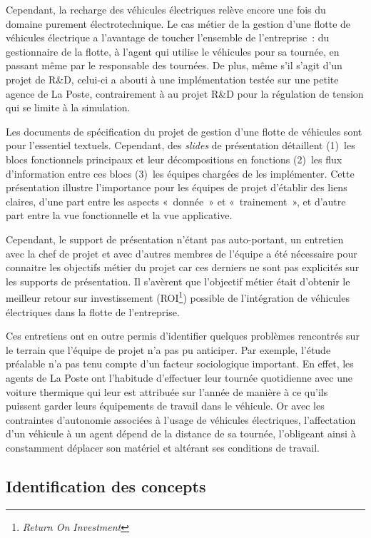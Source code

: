 Cependant, la recharge des véhicules électriques relève encore une fois du
domaine purement électrotechnique. Le cas métier de la gestion d'une flotte de
véhicules électrique a l'avantage de toucher l'ensemble de l'entreprise~: du
gestionnaire de la flotte, à l'agent qui utilise le véhicules pour sa tournée,
en passant même par le responsable des tournées. De plus, même s'il s'agit d'un
projet de R\&D, celui-ci a abouti à une implémentation testée sur une petite
agence de La Poste, contrairement à au projet R\&D pour la régulation de
tension qui se limite à la simulation.

Les documents de spécification du projet de gestion d'une flotte de véhicules
sont pour l'essentiel textuels. Cependant, des \textit{slides} de présentation
détaillent (1)~les blocs fonctionnels principaux et leur décompositions en
fonctions (2)~les flux d'information entre ces blocs (3)~les équipes chargées
de les implémenter. Cette présentation illustre l'importance pour les équipes
de projet d'établir des liens claires, d'une part entre les aspects «~donnée~»
et «~trainement~», et d'autre part entre la vue fonctionnelle et la vue
applicative.

Cependant, le support de présentation n'étant pas auto-portant, un entretien
avec la chef de projet et avec d'autres membres de l'équipe a été nécessaire
pour connaitre les objectifs métier du projet car ces derniers ne sont pas
explicités sur les supports de présentation. Il s'avèrent que l'objectif métier
était d'obtenir le meilleur retour sur investissement
(ROI\footnote{\textit{Return On Investment}}) possible de l'intégration de
véhicules électriques dans la flotte de l'entreprise.

Ces entretiens ont en outre permis d'identifier quelques problèmes rencontrés
sur le terrain que l'équipe de projet n'a pas pu anticiper. Par exemple, l'étude
préalable n'a pas tenu compte d'un facteur sociologique important. En effet,
les agents de La Poste ont l'habitude d'effectuer leur tournée quotidienne avec
une voiture thermique qui leur est attribuée sur l'année de manière à ce qu'ils
puissent garder leurs équipements de travail dans le véhicule. Or avec les
contraintes d'autonomie associées à l'usage de véhicules électriques,
l'affectation d'un véhicule à un agent dépend de la distance de sa tournée,
l'obligeant ainsi à constamment déplacer son matériel et altérant ses
conditions de travail.

\subsection{Identification des concepts}

